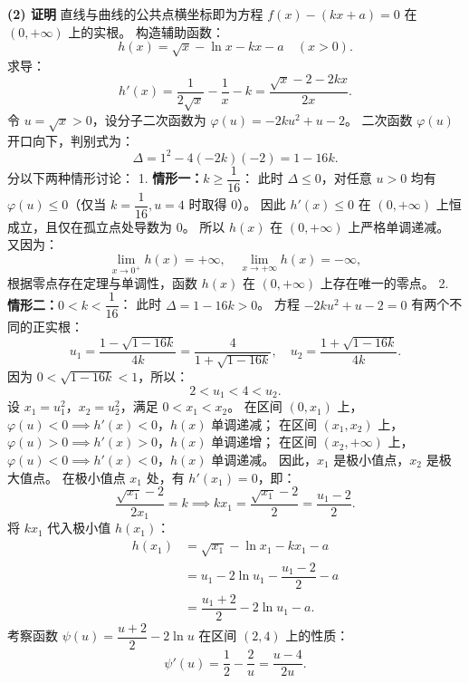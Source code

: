 \begin{answer}
\textbf{(2) 证明} 直线与曲线的公共点横坐标即为方程 $f(x) - (kx + a) = 0$ 在 $(0, +\infty)$ 上的实根。
构造辅助函数：
\nopagebreak[4]
\[h(x) = \sqrt x - \ln x - kx - a\quad (x > 0).\]
求导：
\nopagebreak[4]
\[h'(x) = \dfrac{1}{2\sqrt x} - \dfrac{1}{x} - k = \dfrac{\sqrt x - 2 - 2kx}{2x}.\]
令 $u = \sqrt x > 0$，设分子二次函数为 $\varphi(u) = -2ku^2 + u - 2$。
二次函数 $\varphi(u)$ 开口向下，判别式为：
\nopagebreak[4]
\[\Delta = 1^2 - 4(-2k)(-2) = 1 - 16k.\]
分以下两种情形讨论：
1. \textbf{情形一：$k \geqslant \dfrac{1}{16}$}：
   此时 $\Delta \leqslant 0$，对任意 $u > 0$ 均有 $\varphi(u) \leqslant 0$（仅当 $k = \dfrac{1}{16}, u = 4$ 时取得 $0$）。
   因此 $h'(x) \leqslant 0$ 在 $(0, +\infty)$ 上恒成立，且仅在孤立点处导数为 0。
   所以 $h(x)$ 在 $(0, +\infty)$ 上严格单调递减。
   又因为：
\nopagebreak[4]
\[\lim_{x \to 0^+} h(x) = +\infty,\quad \lim_{x \to +\infty} h(x) = -\infty,\]
   根据零点存在定理与单调性，函数 $h(x)$ 在 $(0, +\infty)$ 上存在唯一的零点。
2. \textbf{情形二：$0 < k < \dfrac{1}{16}$}：
   此时 $\Delta = 1 - 16k > 0$。
   方程 $-2ku^2 + u - 2 = 0$ 有两个不同的正实根：
\nopagebreak[4]
\[u_1 = \dfrac{1 - \sqrt{1 - 16k}}{4k} = \dfrac{4}{1 + \sqrt{1 - 16k}},\quad u_2 = \dfrac{1 + \sqrt{1 - 16k}}{4k}.\]
   因为 $0 < \sqrt{1 - 16k} < 1$，所以：
\nopagebreak[4]
\[2 < u_1 < 4 < u_2.\]
   设 $x_1 = u_1^2$，$x_2 = u_2^2$，满足 $0 < x_1 < x_2$。
   在区间 $(0, x_1)$ 上，$\varphi(u) < 0 \implies h'(x) < 0$，$h(x)$ 单调递减；
   在区间 $(x_1, x_2)$ 上，$\varphi(u) > 0 \implies h'(x) > 0$，$h(x)$ 单调递增；
   在区间 $(x_2, +\infty)$ 上，$\varphi(u) < 0 \implies h'(x) < 0$，$h(x)$ 单调递减。
   因此，$x_1$ 是极小值点，$x_2$ 是极大值点。
   在极小值点 $x_1$ 处，有 $h'(x_1) = 0$，即：
\nopagebreak[4]
\[\dfrac{\sqrt{x_1} - 2}{2x_1} = k \implies kx_1 = \dfrac{\sqrt{x_1} - 2}{2} = \dfrac{u_1 - 2}{2}.\]
   将 $kx_1$ 代入极小值 $h(x_1)$：
\nopagebreak[4]
\[\begin{aligned}
h(x_1) &= \sqrt{x_1} - \ln x_1 - kx_1 - a \\
&= u_1 - 2\ln u_1 - \dfrac{u_1 - 2}{2} - a \\
&= \dfrac{u_1 + 2}{2} - 2\ln u_1 - a.
\end{aligned}\]
   考察函数 $\psi(u) = \dfrac{u + 2}{2} - 2\ln u$ 在区间 $(2, 4)$ 上的性质：
\nopagebreak[4]
\[\psi'(u) = \dfrac12 - \dfrac{2}{u} = \dfrac{u - 4}{2u}.\]

\end{answer}

